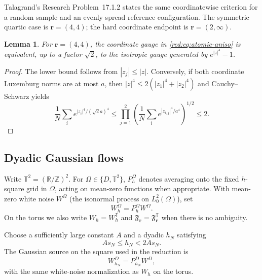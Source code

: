 \documentclass[11pt]{article}
\newtheorem{lemma}[lemma]{Lemma}
\theoremstyle{definition}
\theoremstyle{remark}
\numberwithin{equation}{section}
\newcommand{\T}{\mathbb T}
\newcommand{\R}{\mathbb R}
\begin{document}
Talagrand's Research Problem~17.1.2 \cite{umc:Talagrand2021} states the
same coordinatewise criterion for a random sample and an evenly spread
reference configuration.
The symmetric quartic case is $\boldsymbol r=(4,4)$; the hard coordinate
endpoint is $\boldsymbol r=(2,\infty)$.

\begin{lemma}
\label{red:lem:isotropic-quartic}
For $\boldsymbol r=(4,4)$, the coordinate gauge in
\eqref{red:eq:atomic-aniso} is equivalent, up to a factor $\sqrt2$, to the
isotropic gauge generated by $e^{|z|^4}-1$.
\end{lemma}

\begin{proof}
The lower bound follows from $|z_j|\le|z|$.  Conversely, if both coordinate
Luxemburg norms are at most $a$, then
$|z|^4\le2(|z_1|^4+|z_2|^4)$ and Cauchy--Schwarz yields
\[
 \frac1N\sum_i
 e^{|z_i|^4/(\sqrt2a)^4}
 \le
 \prod_{j=1}^2
 \left(\frac1N\sum_i e^{|z_{i,j}|^4/a^4}\right)^{1/2}
 \le2.
\]
\end{proof}

\subsection{Dyadic Gaussian flows}

Write $\T^2=(\R/\mathbb Z)^2$.  For $\Omega\in\{D,\T^2\}$,
$P_h^{\Omega}$ denotes averaging onto the fixed $h$-square grid
in $\Omega$, acting on mean-zero functions when appropriate.  With
mean-zero white noise $W^{\Omega}$ (the isonormal process on
$L_0^2(\Omega)$), set
\begin{equation}\label{red:eq:compatible-source}
  W_h^{\Omega}=P_h^{\Omega}W^{\Omega}.
\end{equation}
On the torus we also write $W_h=W_h^{\T}$ and
$\mathfrak F_{\boldsymbol r}=\mathfrak F_{\boldsymbol r}^{\T}$ when
there is no ambiguity.

Choose a sufficiently large constant $A$ and a dyadic $h_N$ satisfying
\begin{equation}
 As_N\le h_N<2As_N.
 \label{red:eq:h-choice}
\end{equation}
The Gaussian source on the square used in the reduction is
\begin{equation}
 W_{h_N}^{D}=P_{h_N}^{D}W^{D},
 \label{red:eq:haar-source}
\end{equation}
with the same white-noise normalization as $W_h$ on the torus.
\end{document}
